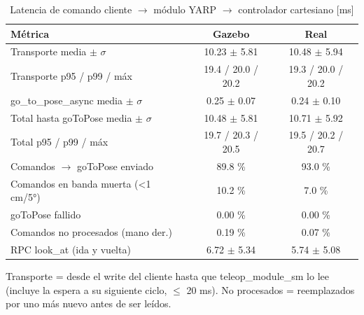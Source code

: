 \begin{table}[htbp]
\centering\small
\caption{Latencia de comando cliente $\rightarrow$ módulo YARP $\rightarrow$ controlador cartesiano [ms]}
\begin{tabular}{lcc}
\toprule
Métrica & Gazebo & Real \\
\midrule
Transporte media $\pm$ $\sigma$ & 10.23 $\pm$ 5.81 & 10.48 $\pm$ 5.94 \\
Transporte p95 / p99 / máx & 19.4 / 20.0 / 20.2 & 19.3 / 20.0 / 20.2 \\
go\_to\_pose\_async media $\pm$ $\sigma$ & 0.25 $\pm$ 0.07 & 0.24 $\pm$ 0.10 \\
Total hasta goToPose media $\pm$ $\sigma$ & 10.48 $\pm$ 5.81 & 10.71 $\pm$ 5.92 \\
Total p95 / p99 / máx & 19.7 / 20.3 / 20.5 & 19.5 / 20.2 / 20.7 \\
Comandos $\rightarrow$ goToPose enviado & 89.8 \% & 93.0 \% \\
Comandos en banda muerta (<1 cm/5°) & 10.2 \% & 7.0 \% \\
goToPose fallido & 0.00 \% & 0.00 \% \\
Comandos no procesados (mano der.) & 0.19 \% & 0.07 \% \\
RPC look\_at (ida y vuelta) & 6.72 $\pm$ 5.34 & 5.74 $\pm$ 5.08 \\
\bottomrule
\end{tabular}
\par\footnotesize Transporte = desde el write del cliente hasta que teleop\_module\_sm lo lee (incluye la espera a su siguiente ciclo, $\leq$ 20 ms). No procesados = reemplazados por uno más nuevo antes de ser leídos.
\end{table}

